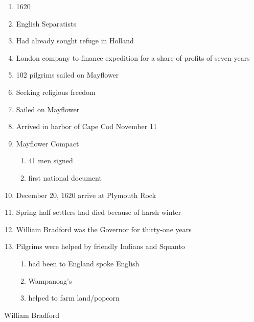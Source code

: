 \documentclass{article}
\begin{document}
\begin{enumerate}
    \item 1620
    \item English Separatists
    \item Had already sought refuge in Holland
    \item London company to finance expedition for a share of profits of seven years
    \item 102 pilgrims sailed on Mayflower
    \item Seeking religious freedom
    \item Sailed on Mayflower
    \item Arrived in harbor of Cape Cod November 11
    \item Mayflower Compact
        \begin{enumerate}
            \item 41 men signed
            \item first national document
        \end{enumerate}
    \item December 20, 1620 arrive at Plymouth Rock
    \item Spring half settlers had died because of harsh winter
    \item William Bradford was the Governor for thirty-one years
    \item Pilgrims were helped by friendly Indians and Squanto
        \begin{enumerate}
            \item had been to England spoke English
            \item Wampanoag’s
            \item helped to farm land/popcorn
        \end{enumerate}
\end{enumerate}

\noindent William Bradford
\end{document}
